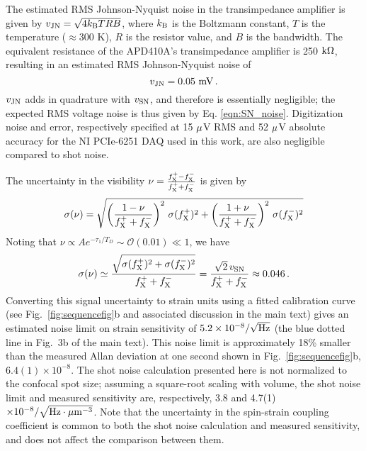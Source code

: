 \documentclass[reprint,superscriptaddress,hyphens,amsmath,amssymb,aps,prx,float]{revtex4-2}
\begin{document}
The estimated RMS Johnson-Nyquist noise in the transimpedance amplifier is given by $v_{\rm JN} = \sqrt{4 k_{\rm B} T R B}$, where $k_{\rm B}$ is the Boltzmann constant, $T$ is the temperature ($\approx 300$ K), $R$ is the resistor value, and $B$ is the bandwidth. The equivalent resistance of the APD410A's transimpedance amplifier is 250 ${\rm k\Omega}$, resulting in an estimated RMS Johnson-Nyquist noise of
\begin{equation}
    v_{\rm JN} = 0.05 ~{\rm mV}\,.
\end{equation}
$v_{\rm{JN}}$ adds in quadrature with $v_{\rm{SN}}$, and therefore is essentially negligible; the expected RMS voltage noise is thus given by Eq. \eqref{eqn:SN_noise}.  Digitization noise and error, respectively specified at 15 $\rm{\mu}$V RMS and 52 $\rm{\mu}$V absolute accuracy for the NI PCIe-6251 DAQ used in this work, are also negligible compared to shot noise.





The uncertainty in the visibility $\nu=\frac{f_{\rm X}^+-f_{\rm X}^-}{f_{\rm X}^++f_{\rm X}^-}$ is given by
\begin{equation}
    \sigma(\nu) = \sqrt{\left(\frac{1 -\nu}{ f_{\rm X}^++f_{\rm X}^-} \right)^2 \, \sigma(f_{\rm X}^+)^2 + \left(\frac{1 + \nu}{f_{\rm X}^++f_{\rm X}^-} \right)^2 \, \sigma(f_{\rm X}^-)^2}
\end{equation}
Noting that $\nu \propto A e^{-\tau_1/T_D} \sim \mathcal{O}(0.01) \ll 1$, we have
\begin{equation}
    \sigma(\nu) \simeq \frac{\sqrt{\sigma(f_{\rm X}^+)^2 + \sigma(f_{\rm X}^-)^2}}{f_{\rm X}^+ + f_{\rm X}^-} = \frac{\sqrt{2} \, v_{\rm SN}}{f_{\rm X}^+ + f_{\rm X}^-} \approx 0.046\,.
\end{equation}
Converting this signal uncertainty to strain units using a fitted calibration curve (see Fig.~\ref{fig:sequencefig}b and associated discussion in the main text) gives an estimated noise limit on strain sensitivity of $5.2 \times 10^{-8}/\sqrt{\rm{Hz}}$ (the blue dotted line in Fig.~3b of the main text).  This noise limit is approximately 18\% smaller than the measured Allan deviation at one second shown in Fig.~\ref{fig:sequencefig}b, $6.4(1) \times 10^{-8}$.  The shot noise calculation presented here is not normalized to the confocal spot size; assuming a square-root scaling with volume, the shot noise limit and measured sensitivity are, respectively, 3.8 and 4.7(1) $\times10^{-8}/\sqrt{\rm{Hz}\cdot\rm{\mu m^{-3}}}$.  Note that the uncertainty in the spin-strain coupling coefficient is common to both the shot noise calculation and measured sensitivity, and does not affect the comparison between them.
\end{document}
